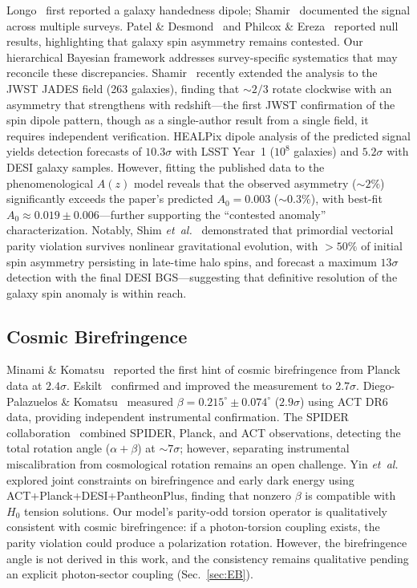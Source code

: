 \documentclass[aps,prd,twocolumn,superscriptaddress,showpacs,preprintnumbers,nofootinbib,longbibliography,floatfix]{revtex4-2}
\newcommand{\etal}{\textit{et~al.}}
\begin{document}
Longo~\cite{Longo2011} first reported a galaxy handedness dipole; Shamir~\cite{Shamir2012,Shamir2022} documented the signal across multiple surveys. Patel \& Desmond~\cite{PatelDesmond2024} and Philcox \& Ereza~\cite{Philcox2025} reported null results, highlighting that galaxy spin asymmetry remains contested. Our hierarchical Bayesian framework addresses survey-specific systematics that may reconcile these discrepancies. Shamir~\cite{ShamirJWSTJADES2025} recently extended the analysis to the JWST JADES field (263 galaxies), finding that ${\sim}2/3$ rotate clockwise with an asymmetry that strengthens with redshift---the first JWST confirmation of the spin dipole pattern, though as a single-author result from a single field, it requires independent verification. HEALPix dipole analysis of the predicted signal yields detection forecasts of $10.3\sigma$ with LSST Year~1 ($10^8$ galaxies) and $5.2\sigma$ with DESI galaxy samples. However, fitting the published data to the phenomenological $A(z)$ model reveals that the observed asymmetry (${\sim}2\%$) significantly exceeds the paper's predicted $A_0 = 0.003$ (${\sim}0.3\%$), with best-fit $A_0 \approx 0.019 \pm 0.006$---further supporting the ``contested anomaly'' characterization. Notably, Shim \etal~\cite{Shim2025} demonstrated that primordial vectorial parity violation survives nonlinear gravitational evolution, with $>50\%$ of initial spin asymmetry persisting in late-time halo spins, and forecast a maximum $13\sigma$ detection with the final DESI BGS---suggesting that definitive resolution of the galaxy spin anomaly is within reach.

\subsection{Cosmic Birefringence}

Minami \& Komatsu~\cite{Minami2020} reported the first hint of cosmic birefringence from Planck data at $2.4\sigma$. Eskilt~\cite{Eskilt2022} confirmed and improved the measurement to $2.7\sigma$. Diego-Palazuelos \& Komatsu~\cite{DiegoPalazuelos2025} measured $\beta = 0.215^\circ \pm 0.074^\circ$ ($2.9\sigma$) using ACT DR6 data, providing independent instrumental confirmation. The SPIDER collaboration~\cite{SPIDER2025} combined SPIDER, Planck, and ACT observations, detecting the total rotation angle ($\alpha + \beta$) at ${\sim}7\sigma$; however, separating instrumental miscalibration from cosmological rotation remains an open challenge. Yin \etal~\cite{Yin2026} explored joint constraints on birefringence and early dark energy using ACT+Planck+DESI+PantheonPlus, finding that nonzero $\beta$ is compatible with $H_0$ tension solutions. Our model's parity-odd torsion operator is qualitatively consistent with cosmic birefringence: if a photon-torsion coupling exists, the parity violation could produce a polarization rotation. However, the birefringence angle is not derived in this work, and the consistency remains qualitative pending an explicit photon-sector coupling (Sec.~\ref{sec:EB}).
\end{document}
